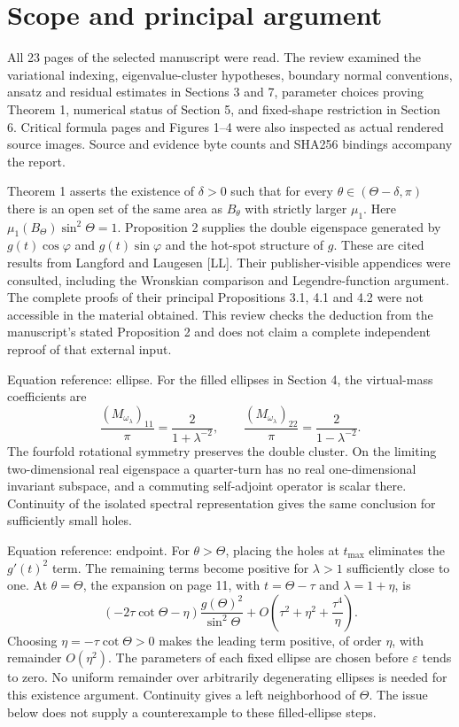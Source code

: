 \documentclass[10pt]{article}
\begin{document}
\section*{Scope and principal argument}
All 23 pages of the selected manuscript were read. The review examined the variational indexing, eigenvalue-cluster hypotheses, boundary normal conventions, ansatz and residual estimates in Sections 3 and 7, parameter choices proving Theorem 1, numerical status of Section 5, and fixed-shape restriction in Section 6. Critical formula pages and Figures 1–4 were also inspected as actual rendered source images. Source and evidence byte counts and SHA256 bindings accompany the report.\par
Theorem 1 asserts the existence of \(\delta>0\) such that for every \(\theta\in(\Theta-\delta,\pi)\) there is an open set of the same area as \(B_\theta\) with strictly larger \(\mu_1\). Here \(\mu_1(B_\Theta)\sin^2\Theta=1\). Proposition 2 supplies the double eigenspace generated by \(g(t)\cos\varphi\) and \(g(t)\sin\varphi\) and the hot-spot structure of \(g\). These are cited results from Langford and Laugesen [LL]. Their publisher-visible appendices were consulted, including the Wronskian comparison and Legendre-function argument. The complete proofs of their principal Propositions 3.1, 4.1 and 4.2 were not accessible in the material obtained. This review checks the deduction from the manuscript’s stated Proposition 2 and does not claim a complete independent reproof of that external input.\par
Equation reference: ellipse. For the filled ellipses in Section 4, the virtual-mass coefficients are \[
 \frac{(M_{\omega_\lambda})_{11}}{\pi}=\frac{2}{1+\lambda^{-2}},
 \qquad
 \frac{(M_{\omega_\lambda})_{22}}{\pi}=\frac{2}{1-\lambda^{-2}}.\] The fourfold rotational symmetry preserves the double cluster. On the limiting two-dimensional real eigenspace a quarter-turn has no real one-dimensional invariant subspace, and a commuting self-adjoint operator is scalar there. Continuity of the isolated spectral representation gives the same conclusion for sufficiently small holes.\par
Equation reference: endpoint. For \(\theta>\Theta\), placing the holes at \(t_{\max}\) eliminates the \(g'(t)^2\) term. The remaining terms become positive for \(\lambda>1\) sufficiently close to one. At \(\theta=\Theta\), the expansion on page 11, with \(t=\Theta-\tau\) and \(\lambda=1+\eta\), is \[
 (-2\tau\cot\Theta-\eta)\frac{g(\Theta)^2}{\sin^2\Theta}
 +O\!\left(\tau^2+\eta^2+\frac{\tau^4}{\eta}\right).\] Choosing \(\eta=-\tau\cot\Theta>0\) makes the leading term positive, of order \(\eta\), with remainder \(O(\eta^2)\). The parameters of each fixed ellipse are chosen before \(\varepsilon\) tends to zero. No uniform remainder over arbitrarily degenerating ellipses is needed for this existence argument. Continuity gives a left neighborhood of \(\Theta\). The issue below does not supply a counterexample to these filled-ellipse steps.\par
\end{document}
